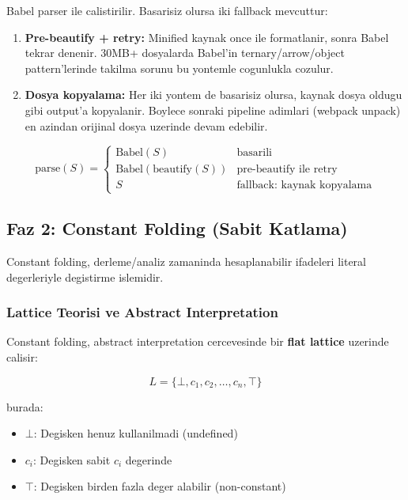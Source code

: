 Babel parser  ile calistirilir. Basarisiz olursa iki fallback mevcuttur:

\begin{enumerate}
\item \textbf{Pre-beautify + retry:} Minified kaynak once  ile formatlanir, sonra Babel tekrar denenir. 30MB+ dosyalarda Babel'in ternary/arrow/object pattern'lerinde takilma sorunu bu yontemle cogunlukla cozulur.
\item \textbf{Dosya kopyalama:} Her iki yontem de basarisiz olursa, kaynak dosya oldugu gibi output'a kopyalanir. Boylece sonraki pipeline adimlari (webpack unpack) en azindan orijinal dosya uzerinde devam edebilir.
\end{enumerate}

\begin{equation}
\text{parse}(S) = \begin{cases}
\text{Babel}(S) & \text{basarili} \\
\text{Babel}(\text{beautify}(S)) & \text{pre-beautify ile retry} \\
S & \text{fallback: kaynak kopyalama}
\end{cases}
\end{equation}


\subsection{Faz 2: Constant Folding (Sabit Katlama)}
\label{sec:phase2-cf}

Constant folding, derleme/analiz zamaninda hesaplanabilir ifadeleri literal degerleriyle degistirme islemidir.

\subsubsection{Lattice Teorisi ve Abstract Interpretation}

Constant folding, abstract interpretation cercevesinde bir \textbf{flat lattice} uzerinde calisir:

\begin{equation}
L = \{\bot, c_1, c_2, \ldots, c_n, \top\}
\end{equation}

burada:
\begin{itemize}
\item $\bot$: Degisken henuz kullanilmadi (undefined)
\item $c_i$: Degisken sabit $c_i$ degerinde
\item $\top$: Degisken birden fazla deger alabilir (non-constant)
\end{itemize}

